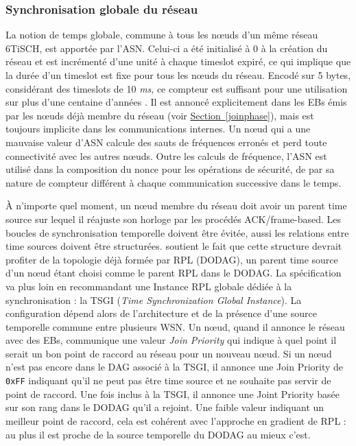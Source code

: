 \documentclass[]{report}
\newcommand{\wordlink}[2]{\hyperref[#2]{#1~\ref{#2}}}
\begin{document}
\subsubsection{Synchronisation globale du réseau}

\par La notion de temps globale, commune à tous les nœuds d'un même réseau 6TiSCH, est apportée par l'ASN. Celui-ci a été initialisé à 0 à la création du réseau et est incrémenté d'une unité à chaque timeslot expiré, ce qui implique que la durée d'un timeslot est fixe pour tous les nœuds du réseau. Encodé sur 5 bytes, considérant des timeslots de 10 \textit{ms}, ce compteur est suffisant pour une utilisation sur plus d'une centaine d'années \cite{stack-IoT}. Il est annoncé explicitement dans les EBs émis par les nœuds déjà membre du réseau (voir \wordlink{Section}{joinphase}), mais est toujours implicite dans les communications internes. Un nœud qui a une mauvaise valeur d'ASN calcule des sauts de fréquences erronés et perd toute connectivité avec les autres nœuds. Outre les calculs de fréquence, l'ASN est utilisé dans la composition du nonce pour les opérations de sécurité, de par sa nature de compteur différent à chaque communication successive dans le temps.\\

\par À n'importe quel moment, un nœud membre du réseau doit avoir un parent time source sur lequel il réajuste son horloge par les procédés ACK/frame-based. Les boucles de synchronisation temporelle doivent être évitée, aussi les relations entre time sources doivent être structurées. \cite{ietf-6tisch-minimal-security-15} soutient le fait que cette structure devrait profiter de la topologie déjà formée par RPL (DODAG), un parent time source d'un nœud étant choisi comme le parent RPL dans le DODAG. La spécification \cite{ietf-6tisch-architecture-28} va plus loin en recommandant une Instance RPL globale dédiée à la synchronisation : la TSGI (\textit{Time Synchronization Global Instance}). La configuration dépend alors de l'architecture et de la présence d'une source temporelle commune entre plusieurs WSN. Un nœud, quand il annonce le réseau avec des EBs, communique une valeur \textit{Join Priority} qui indique à quel point il serait un bon point de raccord au réseau pour un nouveau nœud. Si un nœud n'est pas encore dans le DAG associé à la TSGI, il annonce une Join Priority de \texttt{0xFF} indiquant qu'il ne peut pas être time source et ne souhaite pas servir de point de raccord. Une fois inclus à la TSGI, il annonce une Joint Priority basée sur son rang dans le DODAG qu'il a rejoint. Une faible valeur indiquant un meilleur point de raccord, cela est cohérent avec l'approche en gradient de RPL : au plus il est proche de la source temporelle du DODAG au mieux c'est.\\
\end{document}
